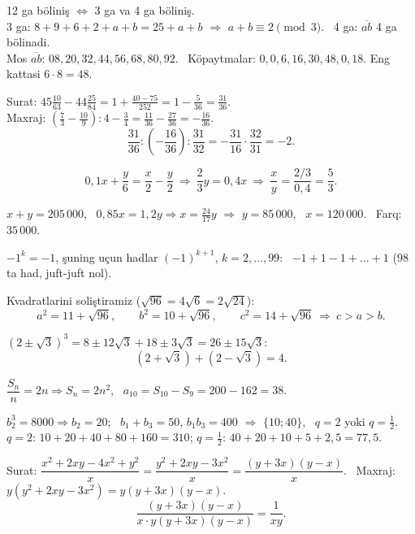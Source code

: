 




12 ga böliniş $\iff$ 3 ga va 4 ga böliniş.\\
3 ga: $8+9+6+2+a+b=25+a+b$ $\Rightarrow$ $a+b\equiv2\pmod3$. \ 4 ga: $\overline{ab}$ 4 ga bölinadi.\\
Mos $\overline{ab}$: $08,20,32,44,56,68,80,92$. \ Köpaytmalar: $0,0,6,16,30,48,0,18$. Eng kattasi $6\cdot8=48$.

Surat: $45\frac{10}{63}-44\frac{25}{84}=1+\frac{40-75}{252}=1-\frac5{36}=\frac{31}{36}$.\\
Maxraj: $\left(\frac73-\frac{10}9\right):4-\frac34=\frac{11}{36}-\frac{27}{36}=-\frac{16}{36}$.
\[\frac{31}{36}:\left(-\frac{16}{36}\right):\frac{31}{32}=-\frac{31}{16}\cdot\frac{32}{31}=-2.\]

\[0{,}1x+\frac y6=\frac x2-\frac y2\ \Rightarrow\ \frac23y=0{,}4x\ \Rightarrow\ \frac xy=\frac{2/3}{0{,}4}=\frac53.\]

$x+y=205\,000$, \ $0{,}85x=1{,}2y\Rightarrow x=\frac{24}{17}y$ $\Rightarrow$ $y=85\,000$, \ $x=120\,000$. \ Farq: $35\,000$.

$-1^k=-1$, şuning uçun hadlar $(-1)^{k+1}$, $k=2,\dots,99$: \ $-1+1-1+\dots+1$ (98 ta had, juft-juft nol).

Kvadratlarini soliştiramiz ($\sqrt{96}=4\sqrt6=2\sqrt{24}$):
\[a^2=11+\sqrt{96},\qquad b^2=10+\sqrt{96},\qquad c^2=14+\sqrt{96}\ \Rightarrow\ c>a>b.\]

$(2\pm\sqrt3)^3=8\pm12\sqrt3+18\pm3\sqrt3=26\pm15\sqrt3$:
\[(2+\sqrt3)+(2-\sqrt3)=4.\]

$\dfrac{S_n}n=2n\Rightarrow S_n=2n^2$, \ $a_{10}=S_{10}-S_9=200-162=38$.

$b_2^3=8000\Rightarrow b_2=20$; \ $b_1+b_3=50$, $b_1b_3=400$ $\Rightarrow$ $\{10;40\}$, \ $q=2$ yoki $q=\frac12$.\\
$q=2$: $10+20+40+80+160=310$; \quad $q=\frac12$: $40+20+10+5+2{,}5=77{,}5$.

Surat: $\dfrac{x^2+2xy-4x^2+y^2}x=\dfrac{y^2+2xy-3x^2}x=\dfrac{(y+3x)(y-x)}x$. \ Maxraj: $y(y^2+2xy-3x^2)=y(y+3x)(y-x)$.
\[\frac{(y+3x)(y-x)}{x\cdot y(y+3x)(y-x)}=\frac1{xy}.\]

